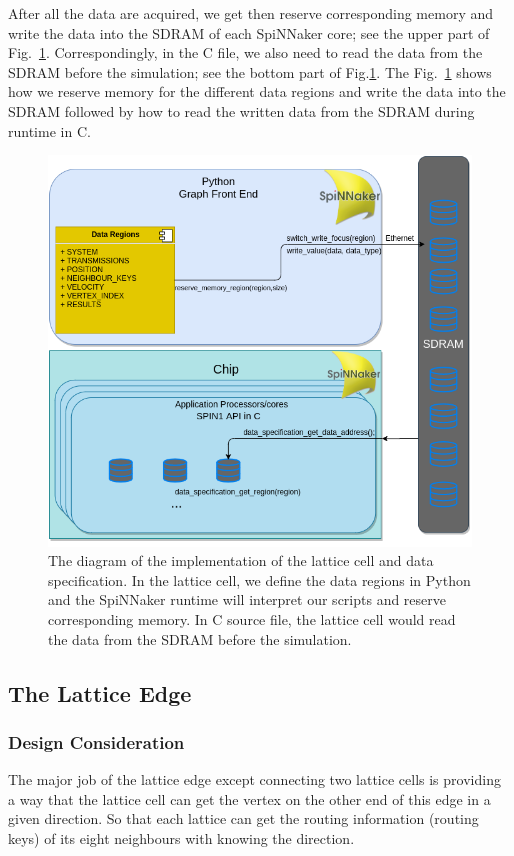 After all the data are acquired, we get then reserve corresponding memory and write the data into the SDRAM of each SpiNNaker core; see the upper part of Fig.~\ref{fig:write_data}. Correspondingly, in the C file, we also need to read the data from the SDRAM before the simulation; see the bottom part of Fig.\ref{fig:write_data}. The Fig.~\ref{fig:write_data} shows how we reserve memory for the different data regions and write the data into the SDRAM followed by how to read the written data from the SDRAM during runtime in C.\\
\begin{figure}[tb]
   \centering
       \includegraphics[width=1\textwidth]{figures/write_data.png}
       \caption{The diagram of the implementation of the lattice cell and data specification. In the lattice cell, we define the data regions in Python and the SpiNNaker runtime will interpret our scripts and reserve corresponding memory. In C source file, the lattice cell would read the data from the SDRAM before the simulation.}
       \label{fig:write_data}
\end{figure}



\subsection{The Lattice Edge} \label{sec:tle}
\subsubsection{Design Consideration}
The major job of the lattice edge except connecting two lattice cells is providing a way that the lattice cell can get the vertex on the other end of this edge in a given direction. So that each lattice can get the routing information (routing keys) of its eight neighbours with knowing the direction. \\
